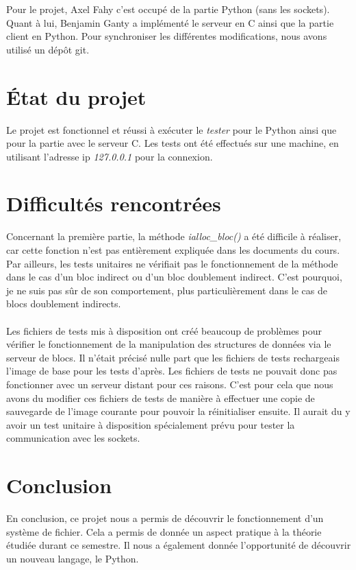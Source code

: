 \documentclass[12pt]{article}
\begin{document}
Pour le projet, Axel Fahy c'est occupé de la partie Python (sans les sockets).
\\
Quant à lui, Benjamin Ganty a implémenté le serveur en C ainsi que la partie client en 
Python.
Pour synchroniser les différentes modifications, nous avons utilisé un dépôt git.


\section{État du projet}
Le projet est fonctionnel et réussi à exécuter le \textit{tester} pour le Python ainsi
que pour la partie avec le serveur C. 
Les tests ont été effectués sur une machine, en utilisant l'adresse ip \textit{127.0.0.1} 
pour la connexion.


\section{Difficultés rencontrées}

Concernant la première partie, la méthode \textit{ialloc\_bloc()} a été difficile à 
réaliser, car cette fonction n'est pas entièrement expliquée dans les documents du cours. 
Par ailleurs, les tests unitaires ne vérifiait pas le fonctionnement de la méthode 
dans le cas d'un bloc indirect ou d'un bloc doublement indirect.
C'est pourquoi, je ne suis pas sûr de son comportement, plus particulièrement dans 
le cas de blocs doublement indirects.
\\\\
Les fichiers de tests mis à disposition ont créé beaucoup de problèmes pour
vérifier le fonctionnement de la manipulation des structures de données via
le serveur de blocs. Il n'était précisé nulle part que les fichiers de tests
rechargeais l'image de base pour les tests d'après. Les fichiers de tests ne pouvait
donc pas fonctionner avec un serveur distant pour ces raisons. C'est pour cela
que nous avons du modifier ces fichiers de tests de manière à effectuer une copie
de sauvegarde de l'image courante pour pouvoir la réinitialiser ensuite.
Il aurait du y avoir un test unitaire à disposition spécialement prévu pour 
tester la communication avec les sockets.


\section{Conclusion}

En conclusion, ce projet nous a permis de découvrir le fonctionnement d'un système
de fichier. Cela a permis de donnée un aspect pratique à la théorie étudiée 
durant ce semestre. Il nous a également donnée l'opportunité de découvrir un
nouveau langage, le Python.
\end{document}
